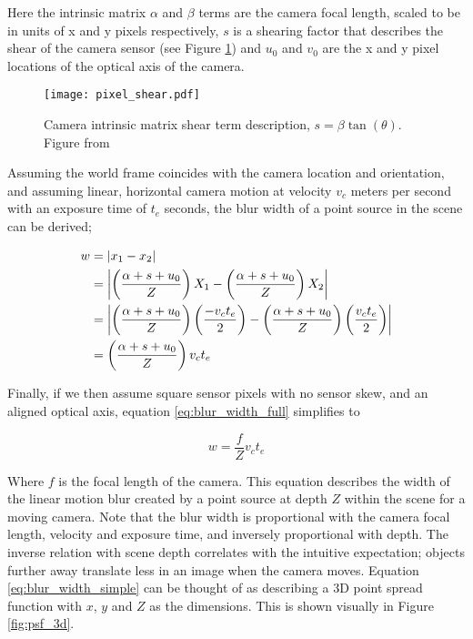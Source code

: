Here the intrinsic matrix $\alpha$ and $\beta$ terms are the camera focal length, scaled to be in units of x and y pixels respectively, $s$ is a shearing factor that describes the shear of the camera sensor (see Figure \ref{fig:intrinsic_shear}) and $u_0$ and $v_0$ are the x and y pixel locations of the optical axis of the camera.

\begin{figure}[h]
\centering
\texttt{[image: pixel\_shear.pdf]}
\caption[Camera intrinsic matrix shear term]{Camera intrinsic matrix shear term description, $s = \beta\tan(\theta)$. Figure from \cite{pollefeys2002visual}}
\label{fig:intrinsic_shear}
\end{figure}

Assuming the world frame coincides with the camera location and orientation, and assuming linear, horizontal camera motion at velocity $v_c$ meters per second with an exposure time of $t_e$ seconds, the blur width of a point source in the scene can be derived;

\begin{align}
w &= \left| x_1 - x_2 \right| \notag \\
&= \left| \left( \frac{\alpha + s + u_0}{Z} \right) X_1 - \left( \frac{\alpha + s + u_0}{Z} \right) X_2 \right| \notag \\
&= \left| \left( \frac{\alpha + s + u_0}{Z} \right) \left(\frac{- v_c t_e}{2}\right) - \left( \frac{\alpha + s + u_0}{Z} \right) \left(\frac{v_c t_e}{2}\right) \right| \notag \\
\label{eq:blur_width_full}
&= \left( \frac{\alpha + s + u_0}{Z} \right) v_c t_e
\end{align}

Finally, if we then assume square sensor pixels with no sensor skew, and an aligned optical axis, equation \ref{eq:blur_width_full} simplifies to

\begin{equation}
\label{eq:blur_width_simple}
w = \frac{f}{Z} v_c t_e
\end{equation}

Where $f$ is the focal length of the camera.
This equation describes the width of the linear motion blur created by a point source at depth $Z$ within the scene for a moving camera.
Note that the blur width is proportional with the camera focal length, velocity and exposure time, and inversely proportional with depth.
The inverse relation with scene depth correlates with the intuitive expectation; objects further away translate less in an image when the camera moves.
Equation \ref{eq:blur_width_simple} can be thought of as describing a 3D point spread function with $x$, $y$ and $Z$ as the dimensions.
This is shown visually in Figure \ref{fig:psf_3d}.


